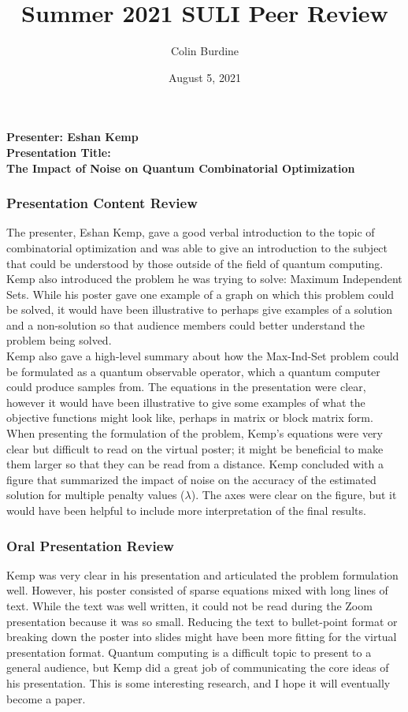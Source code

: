 \documentclass[12pt]{article}
\author{Colin Burdine}
\title{Summer 2021 SULI Peer Review}
\date{August 5, 2021}
\begin{document}
\maketitle

\begin{center}
\textbf{Presenter: Eshan Kemp}\\[2mm]
\textbf{Presentation Title: \\The Impact of Noise on Quantum Combinatorial Optimization}
\end{center}

\subsubsection*{Presentation Content Review}

The presenter, Eshan Kemp, gave a good verbal introduction to the topic of combinatorial optimization and was able to give an introduction to the subject that could be understood by those outside of the field of quantum computing. Kemp also introduced the problem he was trying to solve: Maximum Independent Sets. While his poster gave one example of a graph on which this problem could be solved, it would have been illustrative to perhaps give examples of a solution and a non-solution so that audience members could better understand the problem being solved.\\

Kemp also gave a high-level summary about how the Max-Ind-Set problem could be formulated as a quantum observable operator, which a quantum computer could produce samples from. The equations in the presentation were clear, however it would have been illustrative to give some examples of what the objective functions might look like, perhaps in matrix or block matrix form. When presenting the formulation of the problem, Kemp's equations were very clear but difficult to read on the virtual poster; it might be beneficial to make them larger so that they can be read from a distance. Kemp concluded with a figure that summarized the impact of noise on the accuracy of the estimated solution for multiple penalty values ($\lambda$). The axes were clear on the figure, but it would have been helpful to include more interpretation of the final results.

\subsubsection*{Oral Presentation Review}

Kemp was very clear in his presentation and articulated the problem formulation well. However, his poster consisted of sparse equations mixed with long lines of text. While the text was well written, it could not be read during the Zoom presentation because it was so small. Reducing the text to bullet-point format or breaking down the poster into slides might have been more fitting for the virtual presentation format. Quantum computing is a difficult topic to present to a general audience, but Kemp did a great job of communicating the core ideas of his presentation. This is some interesting research, and I hope it will eventually become a paper.
\end{document}
